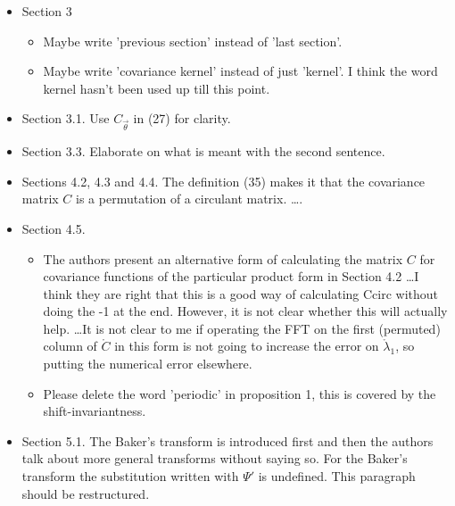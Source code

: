 \documentclass{amsart}
\begin{document}
\begin{itemize}
\item Section 3
\begin{itemize}
\item Maybe write 'previous section' instead of 'last section'.  
\item Maybe write 'covariance kernel' instead of just 'kernel'. I think the word
kernel hasn't been used up till this point.  
\end{itemize}

\item Section 3.1. Use $C_{\vec{\theta}}$ in (27) for clarity. 

\item Section 3.3. Elaborate on what is meant with the second sentence.  

\item Sections 4.2, 4.3 and 4.4. 
The definition (35) makes it that the covariance matrix $C$ is a permutation
of a circulant matrix. \ldots. 

\item  Section 4.5. 
\begin{itemize}
    \item The authors present an alternative form of calculating the matrix $C$ for
covariance functions of the particular product form in Section 4.2 \ldots I think they are right that this is a good
way of calculating Ccirc without doing the -1 at the end.
However, it is not clear whether this will actually help. \ldots It is not clear to me if operating
the FFT on the first (permuted) column of $\mathring{C}$ in this form is not going to
increase the error on $\mathring{\lambda}_1$, so putting the numerical error elsewhere. 

\item Please delete the word 'periodic' in proposition 1, this is covered by the
shift-invariantness. 
\end{itemize}

\item Section 5.1. The Baker's transform is introduced first and then the authors talk about
more general transforms without saying so. For the Baker's transform the
substitution written with $\Psi'$ is undefined. This paragraph should be
restructured. 

\end{itemize}
\end{document}
